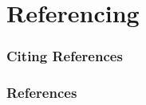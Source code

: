 \documentclass[
  11pt, %
  xcolor=dvipsnames
]{beamer}
\begin{document}

\begin{frame}

	\begin{columns}
		\begin{column}{0.9\textwidth}

		\end{column}
	\end{columns}
\end{frame}






































\section{Referencing}

\begin{frame}
	\frametitle{Citing References}

	\bigskip %

\end{frame}


\begin{frame} %
	\frametitle{References}

	\begin{thebibliography}{99} %
		\footnotesize %

	\end{thebibliography}
\end{frame}
\end{document}
